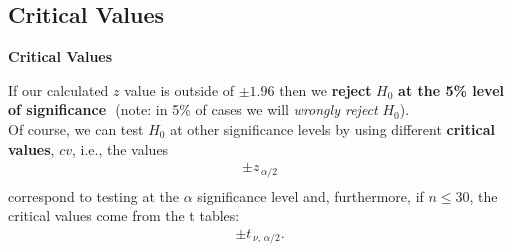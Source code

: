 \documentclass[compress]{beamer}        %
\makeatletter
\newcommand{\tcb}{\textcolor{beamer@blendedblue}}
\makeatother
\begin{document}
\subsection{Critical Values}
\begin{frame}{\bf \tcb{Critical Values}}

If our calculated $z$ value is outside of $\pm 1.96$ then we {\bf reject} {\boldmath$H_0$} {\bf at the 5\% level of significance}\,\, {\footnotesize(note: in 5\% of cases we will \emph{wrongly reject} $H_0$)}.\\[1cm]

Of course, we can test $H_0$ at other significance levels by using different {\bf critical values}, $cv$, i.e., the values\\[-0.3cm]
\begin{align*}
\boxed{\pm z_{\,\alpha/2}}\\[-0.3cm]
\end{align*}
correspond to testing at the $\alpha$ significance level and, furthermore, if $n\le30$, the critical values come from the t tables:\\[-0.3cm]
\begin{align*}
\boxed{\pm t_{\,\nu,\,\alpha/2}}.
\end{align*}

\end{frame}
\end{document}
